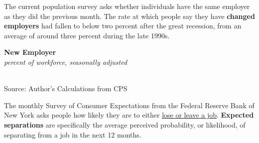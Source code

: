 \documentclass{report}
\makeatletter
\newcommand{\tbllink}[1]{\href{https://raw.githubusercontent.com/bdecon/US-chartbook/master/chartbook/data/#1}{\faTable}}
\newcommand*\short[1]{\expandafter\@gobbletwo\number\numexpr#1\relax}
\newcommand{\dateaxisticks}{
		date coordinates in=x, axis line style={draw=none},
		xmax={2023-02-15},
		max space between ticks=40,	    
		xtick={{1990-01-01}, {1992-01-01}, {1994-01-01}, 
			{1996-01-01}, {1998-01-01}, {2000-01-01}, 
			{2002-01-01}, {2004-01-01}, {2006-01-01},
			{2008-01-01}, {2010-01-01}, {2012-01-01}, {2014-01-01},
		    {2016-01-01}, {2018-01-01}, {2020-01-01}, {2022-01-01}, 
		    {2024-01-01}, {2026-01-01}},
		minor xtick={{1989-01-01}, {1991-01-01}, {1993-01-01},
			{1995-01-01}, {1997-01-01}, {1999-01-01}, 
			{2001-01-01}, {2003-01-01}, {2005-01-01}, {2007-01-01},
		    {2009-01-01}, {2011-01-01}, {2013-01-01}, {2015-01-01},
		    {2017-01-01}, {2019-01-01}, {2021-01-01}, {2023-01-01}, 
		    {2025-01-01}, {2027-01-01}},
		enlarge y limits={0.06}, enlarge x limits={0.01},
		}
\newcommand{\stdline}[4]{\addplot[very thick, no markers, color=#1] 
		table [x=#2, y=#3, col sep=comma] {#4};	}
\newcommand{\thickline}[4]{\addplot[ultra thick, no markers, color=#1] 
		table [x=#2, y=#3, col sep=comma] {#4};	}
\newcommand{\rebars}{
		\fill[color=black!10] (axis cs:{2007-12-01},\pgfkeysvalueof{/pgfplots/ymin}) rectangle 
			(axis cs:{2009-07-01}, \pgfkeysvalueof{/pgfplots/ymax});
		\fill[color=black!10] (axis cs:{2001-03-01},\pgfkeysvalueof{/pgfplots/ymin}) rectangle 
			(axis cs:{2001-11-01}, \pgfkeysvalueof{/pgfplots/ymax});
		\fill[color=black!10] (axis cs:{2020-02-01},\pgfkeysvalueof{/pgfplots/ymin}) rectangle 
			(axis cs:{2020-05-01}, \pgfkeysvalueof{/pgfplots/ymax});}
\makeatother
\begin{document}
{\begin{minipage}{0.76\textwidth}
The current population survey asks whether individuals have the same employer as they did the previous month. The rate at which people say they have \textbf{changed employers} had fallen to below two percent after the great recession, from an average of around three percent during the late 1990s. 

 
\vspace{1mm}

\normalsize \textbf{New Employer}\\
\footnotesize{\textit{percent of workforce, seasonally adjusted}}\\
\hspace*{-2mm} \\
\footnotesize{Source: Author's Calculations from CPS} \hfill \tbllink{jobswitch.csv} 
\vspace{5mm}

\small The monthly Survey of Consumer Expectations from the Federal Reserve Bank of New York asks people how likely they are to either \href{https://www.newyorkfed.org/microeconomics/sce#/jobsep-1}{lose or leave a job}. \textbf{Expected separations} are specifically the average perceived probability, or likelihood, of separating from a job in the next 12 months. 


\end{minipage}}
\end{document}

